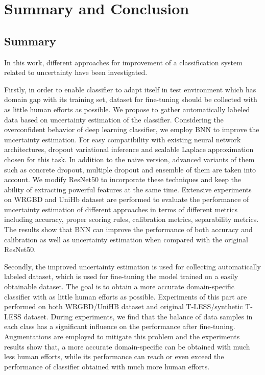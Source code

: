 \chapter{Summary and Conclusion}
\section{Summary}
In this work, different approaches for improvement of a classification system related to uncertainty have been investigated.
 
Firstly, in order to enable classifier to adapt itself in test environment which has domain gap with its training set, dataset for fine-tuning should be collected with as little human efforts as possible. We propose to gather automatically labeled data based on uncertainty estimation of the classifier. Considering the overconfident behavior of deep learning classifier, we employ \gls{BNN} to improve the uncertainty estimation. For easy compatibility with existing neural network architectures, dropout variational inference and scalable Laplace approximation chosen for this task. In addition to the naive version, advanced variants of them such as concrete dropout, multiple dropout and ensemble of them are taken into account. We modify ResNet50 to incorporate these techniques and keep the ability of extracting powerful features at the same time. Extensive experiments on \gls{WRGBD} and UniHb dataset are performed to evaluate the performance of uncertainty estimation of different approaches in terms of different metrics including accuracy, proper scoring rules, calibration metrics, separability metrics. The results show that \gls{BNN} can improve the performance of both accuracy and calibration as well as uncertainty estimation when compared with the original ResNet50. 

Secondly, the improved uncertainty estimation is used for collecting automatically labeled dataset, which is used for fine-tuning the model trained on a easily obtainable dataset. The goal is to obtain a more accurate domain-specific classifier with as little human efforts as possible. Experiments of this part are performed on both \gls{WRGBD}/UniHB dataset and original T-LESS/synthetic T-LESS dataset. During experiments, we find that the balance of data samples in each class has a significant influence on the performance after fine-tuning. Augmentations are employed to mitigate this problem and the experiments results show that, a more accurate domain-specific can be obtained with much less human efforts, while its performance can reach or even exceed the performance of classifier obtained with much more human efforts.


